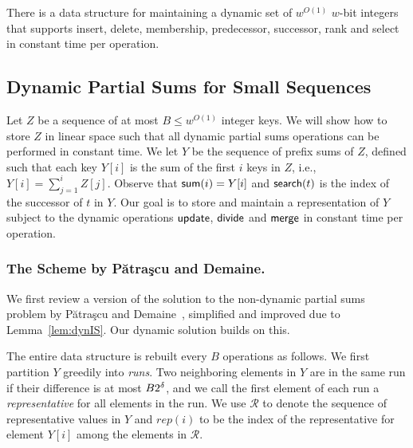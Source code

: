 \begin{lemma}\label{lem:dynIS}
    There is a data structure for maintaining a dynamic set of $w^{O(1)}$ $w$-bit integers that supports insert, delete, membership, predecessor, successor, rank and select in constant time per operation.
    
\end{lemma}


\subsection{Dynamic Partial Sums for Small Sequences}
Let $Z$ be a sequence of at most $B \leq w^{O(1)}$ integer keys. We will show how to store $Z$ in linear space such that all dynamic partial sums operations can be performed in constant time. We let $Y$ be the sequence of prefix sums of $Z$, defined such that each key $Y[i]$ is the sum of the first $i$ keys in $Z$, i.e., $Y[i] = \sum_{j=1}^i Z[j]$. 
Observe that $\mathsf{sum}(i) = Y[i]$ and $\mathsf{search}(t)$ is the index of the successor of $t$ in $Y$. Our goal is to store and maintain a representation of $Y$ subject to the dynamic operations $\mathsf{update}$, $\mathsf{divide}$ and $\mathsf{merge}$ in constant time per operation.

\subsubsection{The Scheme by Pătraşcu and Demaine.}
We first review a version of the solution to the non-dynamic partial sums problem by Pătraşcu and Demaine~\cite{puaatracscu2004tight}, simplified and improved due to Lemma~\ref{lem:dynIS}. Our dynamic solution builds on this.

The entire data structure is rebuilt every $B$ operations as follows. We first partition $Y$ greedily into \emph{runs}. Two neighboring elements in $Y$ are in the same run if their difference is at most $B 2^\delta$, and we call the first element of each run a \emph{representative} for all elements in the run. We use $\mathcal{R}$ to denote the sequence of representative values in $Y$ and $rep(i)$ to be the index of the representative for element $Y[i]$ among the elements in $\mathcal{R}$.

